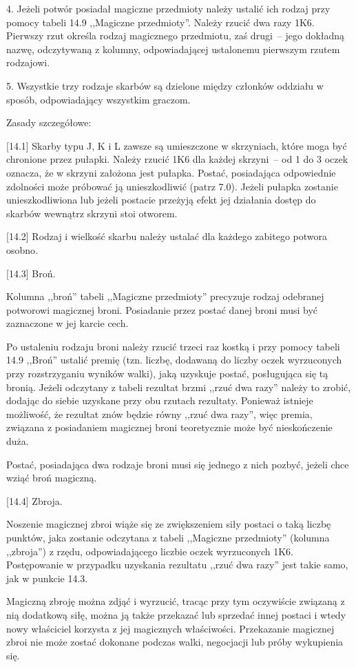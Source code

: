 4. Jeżeli potwór posiadał magiczne przedmioty należy ustalić ich rodzaj przy pomocy tabeli 14.9 ,,Magiczne przedmioty''.
Należy rzucić dwa razy 1K6.
Pierwszy rzut określa rodzaj magicznego przedmiotu, zaś drugi~-- jego dokładną nazwę, odczytywaną z kolumny, odpowiadającej ustalonemu pierwszym rzutem rodzajowi.

5. Wszystkie trzy rodzaje skarbów są dzielone między członków oddziału w sposób, odpowiadający wszystkim graczom.

Zasady szczegółowe:

[14.1] Skarby typu J, K i L zawsze są umieszczone w skrzyniach, które moga być chronione przez pułapki.
Należy rzucić 1K6 dla każdej skrzyni~-- od 1 do 3 oczek oznacza, że w skrzyni założona jest pułapka.
Postać, posiadająca odpowiednie zdolności może próbować ją unieszkodliwić (patrz 7.0).
Jeżeli pułapka zostanie unieszkodliwiona lub jeżeli postacie przeżyją efekt jej działania dostęp do skarbów wewnątrz skrzyni stoi otworem.

[14.2] Rodzaj i wielkość skarbu należy ustalać dla każdego zabitego potwora osobno.

[14.3] Broń.

Kolumna ,,broń'' tabeli ,,Magiczne przedmioty'' precyzuje rodzaj odebranej potworowi magicznej broni.
Posiadanie przez postać danej broni musi być zaznaczone w jej karcie cech.

Po ustaleniu rodzaju broni należy rzucić trzeci raz kostką i przy pomocy tabeli 14.9 ,,Broń'' ustalić premię (tzn. liczbę, dodawaną do liczby oczek wyrzuconych przy rozstrzyganiu wyników walki), jaką uzyskuje postać, posługująca się tą bronią.
Jeżeli odczytany z tabeli rezultat brzmi ,,rzuć dwa razy'' należy to zrobić, dodając do siebie uzyskane przy obu rzutach rezultaty.
Ponieważ istnieje możliwość, że rezultat znów będzie równy ,,rzuć dwa razy'', więc premia, związana z posiadaniem magicznej broni teoretycznie może być nieskończenie duża.

Postać, posiadająca dwa rodzaje broni musi się jednego z nich pozbyć, jeżeli chce wziąć broń magiczną.

[14.4] Zbroja.

Noszenie magicznej zbroi wiąże się ze zwiększeniem siły postaci o taką liczbę punktów, jaka zostanie odczytana z tabeli ,,Magiczne przedmioty'' (kolumna ,,zbroja'') z rzędu, odpowiadającego liczbie oczek wyrzuconych 1K6.
Postępowanie w przypadku uzyskania rezultatu ,,rzuć dwa razy'' jest takie samo, jak w punkcie 14.3.

Magiczną zbroję można zdjąć i wyrzucić, tracąc przy tym oczywiście związaną z nią dodatkową siłę, można ją także przekazać lub sprzedać innej postaci i wtedy nowy właściciel korzysta z jej magicznych właściwości.
Przekazanie magicznej zbroi nie może zostać dokonane podczas walki, negocjacji lub próby wykupienia się.

